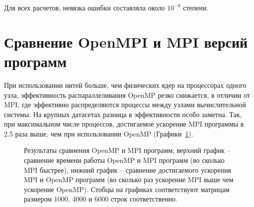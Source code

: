 \documentclass[12pt, oneside, a4paper]{article}
\begin{document}
Для всех расчетов, невязка ошибки составляла около $10^{-9}$ степени.

\section{Сравнение OpenMPI и MPI версий программ}

При использовании нитей больше, чем физических ядер на процессорах одного узла, эффективность распараллеливания OpenMP резко снижается, в отличии от MPI, где эффективно распределяются процессы между узлами вычислительной системы. На крупных датасетах разница в эффективности особо заметна. Так, при максимальном числе процессов, достигаемое ускорение MPI программы в 2.5 раза выше, чем при использовании OpenMP (Графики~\ref{fig:comparison}).

\begin{figure}[h!]
\caption{Результаты сравнения OpenMP и MPI программ; верхний график -- сравнение времени работы OpenMP и MPI программ (во сколько MPI быстрее), нижний график -- сравнение достигаемого ускорения MPI и OpenMP программ (во сколько раз ускорение MPI выше чем ускорение OpenMP). Стобцы на графиках соответствуют матрицам размером 1000, 4000 и 6000 строк соответственно.}
\label{fig:comparison}
\end{figure}
\end{document}
